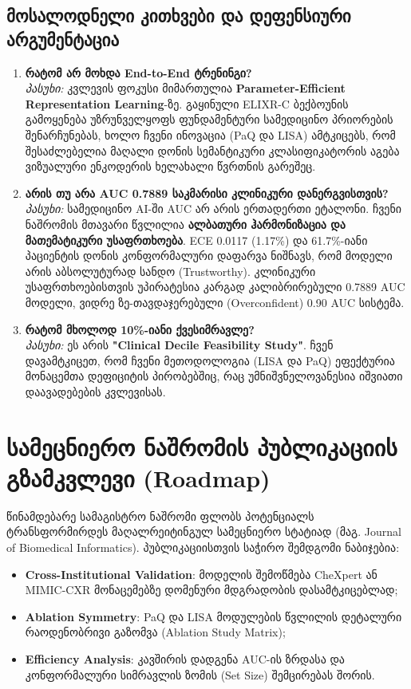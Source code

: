 \documentclass[12pt,a4paper,oneside]{report}
\begin{document}
\subsection{მოსალოდნელი კითხვები და დეფენსიური არგუმენტაცია}
\begin{enumerate}[leftmargin=1.6em]
    \item \textbf{რატომ არ მოხდა End-to-End ტრენინგი?} \\
    \textit{პასუხი:} კვლევის ფოკუსი მიმართულია \textbf{Parameter-Efficient Representation Learning}-ზე. გაყინული ELIXR-C ბექბოუნის გამოყენება უზრუნველყოფს ფუნდამენტური სამედიცინო პრიორების შენარჩუნებას, ხოლო ჩვენი ინოვაცია (PaQ და LISA) ამტკიცებს, რომ შესაძლებელია მაღალი დონის სემანტიკური კლასიფიკატორის აგება ვიზუალური ენკოდერის ხელახალი წვრთნის გარეშეც.
    
    \item \textbf{არის თუ არა AUC 0.7889 საკმარისი კლინიკური დანერგვისთვის?} \\
    \textit{პასუხი:} სამედიცინო AI-ში AUC არ არის ერთადერთი ეტალონი. ჩვენი ნაშრომის მთავარი წვლილია \textbf{ალბათური ჰარმონიზაცია და მათემატიკური უსაფრთხოება}. ECE 0.0117 (1.17\%) და 61.7\%-იანი პაციენტის დონის კონფორმალური დაფარვა ნიშნავს, რომ მოდელი არის აბსოლუტურად სანდო (Trustworthy). კლინიკური უსაფრთხოებისთვის უპირატესია კარგად კალიბრირებული 0.7889 AUC მოდელი, ვიდრე ზე-თავდაჯერებული (Overconfident) 0.90 AUC სისტემა.
    
    \item \textbf{რატომ მხოლოდ 10\%-იანი ქვესიმრავლე?} \\
    \textit{პასუხი:} ეს არის \textbf{"Clinical Decile Feasibility Study"}. ჩვენ დავამტკიცეთ, რომ ჩვენი მეთოდოლოგია (LISA და PaQ) ეფექტურია მონაცემთა დეფიციტის პირობებშიც, რაც უმნიშვნელოვანესია იშვიათი დაავადებების კვლევისას.
\end{enumerate}

\section{სამეცნიერო ნაშრომის პუბლიკაციის გზამკვლევი (Roadmap)}
წინამდებარე სამაგისტრო ნაშრომი ფლობს პოტენციალს ტრანსფორმირდეს მაღალრეიტინგულ სამეცნიერო სტატიად (მაგ. Journal of Biomedical Informatics). პუბლიკაციისთვის საჭირო შემდგომი ნაბიჯებია:
\begin{itemize}
    \item \textbf{Cross-Institutional Validation}: მოდელის შემოწმება CheXpert ან MIMIC-CXR მონაცემებზე დომენური მდგრადობის დასამტკიცებლად;
    \item \textbf{Ablation Symmetry}: PaQ და LISA მოდულების წვლილის დეტალური რაოდენობრივი გაზომვა (Ablation Study Matrix);
    \item \textbf{Efficiency Analysis}: კავშირის დადგენა AUC-ის ზრდასა და კონფორმალური სიმრავლის ზომის (Set Size) შემცირებას შორის.
\end{itemize}
\end{document}
